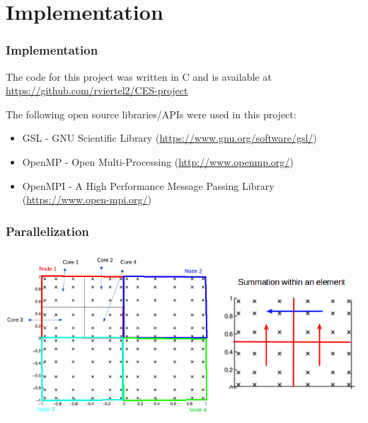 \documentclass{beamer}
\theoremstyle{plain}
\theoremstyle{definition}
\begin{document}
%

\section{Implementation}

\begin{frame}\frametitle{Implementation}
  The code for this project was written in C and is available at \href{https://github.com/rviertel2/CES-project}{https://github.com/rviertel2/CES-project}\\

  \vspace{1em}

  The following open source libraries/APIs were used in this project:
  \begin{itemize}
    \item GSL - GNU Scientific Library (\href{https://www.gnu.org/software/gsl/}{https://www.gnu.org/software/gsl/})
    \item OpenMP - Open Multi-Processing (\href{http://www.openmp.org/}{http://www.openmp.org/})
    \item OpenMPI - A High Performance Message Passing Library (\href{https://www.open-mpi.org/}{https://www.open-mpi.org/})
  \end{itemize}
\end{frame}

\begin{frame}\frametitle{Parallelization}
  \begin{center}
    \includegraphics[scale=.42]{parallel.png}%
  \end{center}
\end{frame}
\end{document}

